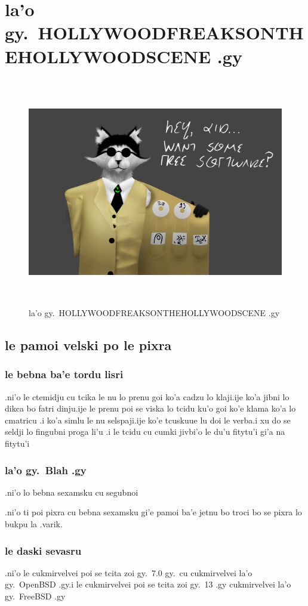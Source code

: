 \documentclass{report}
\newcommand\imageheight{10cm}
\begin{document}
\chapter{la'o gy.\ HOLLYWOODFREAKSONTHEHOLLYWOODSCENE .gy}
\begin{figure}[ht]
	\centering
	\includegraphics[height=\imageheight]{hollywoodfreaksonthehollywoodscene/hollywoodfreaksonthehollywoodscene.png}
	\caption[center]{la'o gy.\ HOLLYWOODFREAKSONTHEHOLLYWOODSCENE .gy}
\end{figure}
\section{le pamoi velski po le pixra}
\subsection{le bebna ba'e tordu lisri}
.ni'o le ctemidju cu tcika le nu lo prenu goi ko'a cadzu lo klaji\@  .ije ko'a jibni lo dikca bo fatri dinju\@  .ije le prenu poi se viska lo tcidu ku'o goi ko'e klama ko'a lo cmatricu
.i ko'a simlu le nu selspaji\@  .ije ko'e tcuskuue lu doi le verba\@  .i xu do se seldji lo fingubni proga li'u
.i le tcidu cu cumki jivbi'o le du'u fitytu'i gi'a na fitytu'i
\subsection{la'o gy.\ Blah .gy}
.ni'o lo bebna sexamsku cu segubnoi

.ni'o ti poi pixra cu bebna sexamsku gi'e pamoi ba'e jetnu bo troci bo se pixra lo bukpu la .varik.
\subsection{le daski sevasru}
.ni'o le cukmirvelvei poi se tcita zoi gy.\ 7.0 gy.\ cu cukmirvelvei la'o gy.\ OpenBSD .gy\@  .i le cukmirvelvei poi se tcita zoi gy.\ 13 .gy cukmirvelvei la'o gy.\ FreeBSD .gy
\end{document}
